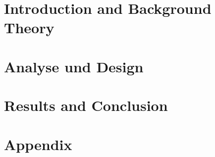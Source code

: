 
\addtolength{\evensidemargin}{-12mm}

%
%
\part[Introduction and Background Theory]{Introduction and Background Theory}
\label{part:introAndBackgroundTheory}



%
\part[Analyse und Design]{Analyse und Design}
\label{part:analysisAndDesign}



\part[Results and Conclusion]{Results and Conclusion}
\label{part:resultsAndConclusion}
 


%
%

\part*{Appendix}

\appendix %


